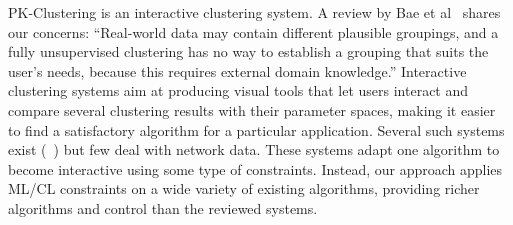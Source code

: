 PK-Clustering is an interactive clustering system. A review by Bae et al~\cite{baeInteractiveClusteringComprehensive2020} shares our concerns:
``Real-world data may contain different plausible groupings, and a fully unsupervised clustering has no way to establish a grouping that suits the user’s needs, because this requires external domain knowledge.''
Interactive clustering systems aim at producing visual tools that let users interact and compare several clustering results with their parameter spaces, making it easier to find a satisfactory algorithm for a particular application. Several such systems exist (\eg~\cite{cavalloClustrophileGuidedVisual2019, xclusim}) but few deal with network data.
These systems adapt one algorithm to become interactive using some type of constraints.
Instead, our approach applies ML/CL constraints on a wide variety of existing algorithms, providing richer algorithms and control than the reviewed systems.




